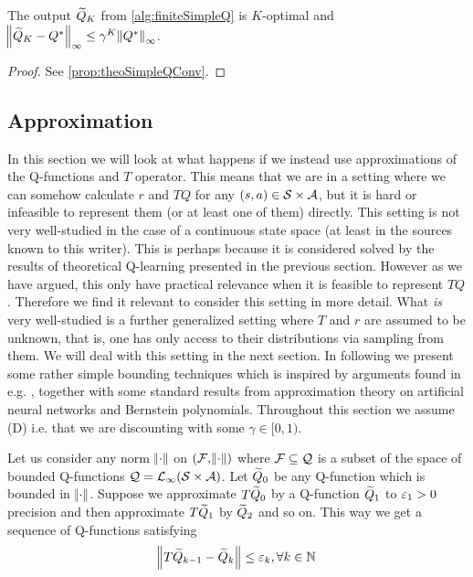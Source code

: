 \begin{prop}
  The output $\widetilde{Q}_K$ from \cref{alg:finiteSimpleQ} is
  $K$-optimal and
  $\norm{\widetilde{Q}_K - Q^*}_\infty \leq \gamma^K \norm{Q^*}_\infty$.
\end{prop}
\begin{proof}
  See \cref{prop:theoSimpleQConv}.
\end{proof}



\subsection{Approximation}
In this section we will look at what happens if we
instead use approximations of the Q-functions and $T$ operator.
This means that we are in a setting where we can somehow
calculate $r$ and $TQ$ for any $(s,a) \in \mathcal{S} \times \mathcal{A}$,
but it is hard or infeasible to represent them (or at least one of them)
directly.
This setting is not very well-studied in the case of a
continuous state space (at least in the sources known to this writer).
This is perhaps because it is considered solved
by the results of theoretical Q-learning presented in the previous section.
However as we have argued, this only have practical relevance 
when it is feasible to represent $TQ$.
Therefore we find it relevant to consider this setting in more detail.
What \emph{is} very well-studied is a further generalized setting
where $T$ and $r$ are assumed to be unknown,
that is, one has only access to their distributions via sampling from them.
We will deal with this setting in the next section.
In following we present some rather simple bounding techniques
which is inspired by arguments found in e.g. ,
together with some standard results from approximation theory
on artificial neural networks and Bernstein polynomials.
Throughout this section we assume (D)
i.e. that we are discounting with some $\gamma \in [0,1)$.

Let us consider any norm $\norm{\cdot}$ on
$(\mathcal{F}, \norm{\cdot})$ where $\mathcal{F} \subseteq \mathcal{Q}$ is
a subset of the space of bounded
Q-functions $\mathcal{Q} = \mathcal{L}_\infty(\mathcal{S}\times\mathcal{A})$.
Let $\widetilde{Q}_0$ be any Q-function which is bounded in $\norm{\cdot}$.
Suppose we approximate $T\widetilde{Q}_0$ by a Q-function $\widetilde{Q}_1$
to $\varepsilon_1 > 0$ precision and then approximate $T\widetilde{Q}_1$ by $\widetilde{Q}_2$
and so on. This way we get a sequence of Q-functions satisfying
\[ \norm{T\widetilde{Q}_{k-1} - \widetilde{Q}_k} \leq \varepsilon_k, \forall k \in \mathbb{N} \]

